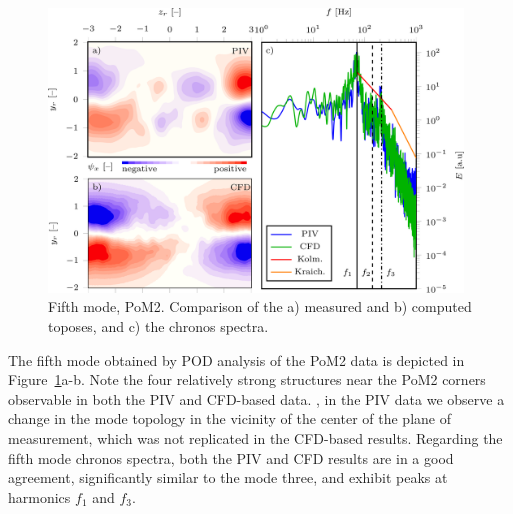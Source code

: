 {\begin{figure}[htbp]
    \centering
    \includegraphics[width=0.98\textwidth]{02_images/00_export/figure16.png}
    \caption{{Fifth mode, PoM2.} Comparison of the a) measured and b) computed toposes, and c) the chronos spectra.}
    \label{fig:pom2mod6}
\end{figure}
The {fifth} mode obtained by POD analysis of the PoM2 data is depicted in Figure~\ref{fig:pom2mod6}a-b. Note the four relatively strong structures near {the PoM2} corners {observable in both the PIV and CFD-based data}.  , in the {PIV} data we observe {a change in the mode topology in the vicinity of the center of the plane of measurement, which was not replicated in the CFD-based results. Regarding the fifth mode chronos spectra, both the PIV and CFD results are in a good agreement, significantly similar to the mode three, and exhibit} peaks at harmonics $f_1$ and $f_3$.



}
